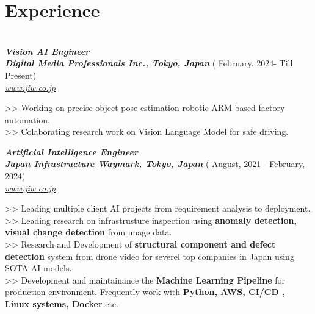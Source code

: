 \documentclass[letterpaper]{twentysecondcv} %
\begin{document}
\makeprofile %

\section{Experience}\\


{\bfseries \itshape \color{gray} Vision AI Engineer} \\
\textbf{\itshape \color{mainblue} Digital Media Professionals Inc., Tokyo, Japan }{\color{golden}  ( February, 2024- Till Present) }\\
{ \href {https://www.dmprof.com}{\itshape \color{blue} www.jiw.co.jp}}

\begin{multiline}
>> Working on precise object pose estimation robotic ARM based factory automation.\\
>> Colaborating research work on Vision Language Model for safe driving.
\end{multiline}

{\bfseries \itshape \color{gray} Artificial Intelligence Engineer} \\
\textbf{\itshape \color{mainblue} Japan Infrastructure Waymark, Tokyo, Japan }{\color{golden}  ( August, 2021 - February, 2024) }\\
{ \href {https://www.jiw.co.jp}{\itshape \color{blue} www.jiw.co.jp}}

\begin{multiline}
>> Leading multiple client AI  projects from requirement analysis to deployment. \\
>> Leading research on infrastrusture inspection using \textbf{anomaly detection, visual change detection} from image data.\\
>> Research and Development of \textbf{structural component and defect detection} system from drone video for severel top companies in Japan using SOTA AI models. \\
>> Development and maintainance the \textbf{Machine Learning Pipeline} for production environment. Frequently work with \textbf{Python, AWS, CI/CD , Linux systems, Docker} etc.
\end{multiline}
\end{document}
